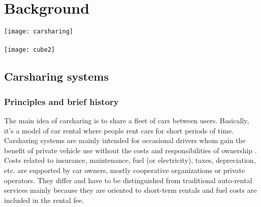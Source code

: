 \chapter{Background} \label{chap:backAndPb} %
\begin{bibunit}[ieeetr]
\minitoc
\vspace{2cm}
%
\noindent
\begin{minipage}[c]{0.3\textwidth}
\centering
\texttt{[image: carsharing]}\\
~\\
\texttt{[image: cube2]}
\end{minipage}
\hfill
\begin{minipage}[c]{0.7\textwidth}
\begin{abstract}
%
%
\end{abstract}
\end{minipage}

\newpage
\section{Carsharing systems} \label{sec:carsharingSystems}

\subsection{Principles and brief history}
The main idea of carsharing is to share a fleet of cars between users.
Basically, it's a model of car rental where people rent cars for short periods of time.
Carsharing systems are mainly intended for occasional drivers whom gain the benefit of private vehicle use without the costs and responsibilities of ownership \cite{shaheen_carsharing_1998}.
Costs related to insurance, maintenance, fuel (or electricity), taxes, depreciation, etc. are supported by car owners, \ie mostly cooperative organizations or private operators.
They differ and have to be distinguished from traditional auto-rental services mainly because they are oriented to short-term rentals and fuel costs are included in the rental fee.


\end{bibunit}
